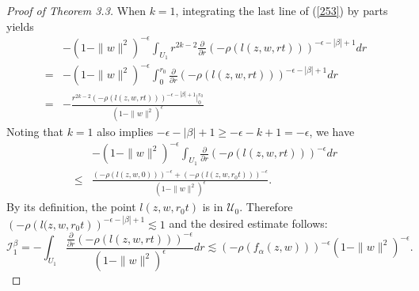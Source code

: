 \documentclass[reqno,12pt]{amsart}
\numberwithin{equation}{section}
\begin{document}
\begin{proof}[Proof of Theorem 3.3]
		{When $k=1$, integrating the last line of (\ref{253}) by parts yields
			\begin{align}\label{269}
			 &-(1-\|w\|^2)^{-\epsilon}\int_{U_1}r^{2k-2}{\frac{\partial}{\partial r}\left(-\rho\left(l(z,w,r t)\right)\right)^{-\epsilon-|\beta|+1}}dr\nonumber
			 \\=&-(1-\|w\|^2)^{-\epsilon}\int_{0}^{r_0}{\frac{\partial}{\partial r}\left(-\rho\left(l(z,w,r t)\right)\right)^{-\epsilon-|\beta|+1}}dr\nonumber
			 \\=&-\frac{r^{2k-2}{\left(-\rho\left(l(z,w,r t)\right)\right)^{-\epsilon-|\beta|+1}}\Big|_0^{r_0}}{(1-\|w\|^2)^{\epsilon}}
			 \end{align}
Noting that  $k=1$ also implies $-\epsilon-|\beta|+1\geq -\epsilon-k+1=-\epsilon$, we have
			 	\begin{align}\label{28}
			 	&-(1-\|w\|^2)^{-\epsilon}\int_{U_1}{\frac{\partial}{\partial r}\left(-\rho\left(l(z,w,r t)\right)\right)^{-\epsilon}}dr\nonumber
			 	\\\leq&\frac{{\left(-\rho\left(l(z,w,0)\right)\right)^{-\epsilon}}+{\left(-\rho\left(l(z,w,r_0t)\right)\right)^{-\epsilon}}}{(1-\|w\|^2)^{\epsilon}}.
			 	\end{align}
			 	By its definition, the point $l(z,w,r_0t)$ is in $\mathcal {U}_0$. Therefore $\left(-\rho\left(l(z,w,r_0t\right)\right)^{-\epsilon-|\beta|+1}\lesssim 1$ and the desired estimate follows:
			 	\begin{equation}\label{260}
			 	\mathcal I^{\beta}_1=-\int_{U_1}\frac{\frac{\partial}{\partial r}\left(-\rho\left(l(z,w,r t)\right)\right)^{-\epsilon}}{(1-\|w\|^2)^{\epsilon}}dr\lesssim\left(-\rho\left(f_{\alpha}(z,w)\right)\right)^{-\epsilon}(1-\|w\|^2)^{-\epsilon}.
			 	\end{equation}
			
}
\end{proof}
\end{document}
